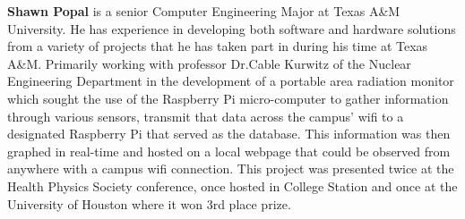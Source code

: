 \documentclass[letterpaper,12pt]{article}
\begin{document}
\textbf{Shawn Popal} is a senior Computer Engineering Major at Texas A\&M University. He has experience in developing both software and hardware solutions from a variety of projects that he has taken part in during his time at Texas A\&M. Primarily working with professor Dr.Cable Kurwitz of the Nuclear Engineering Department in the development of a portable area radiation monitor which sought the use of the Raspberry Pi micro-computer to gather information through various sensors, transmit that data across the campus' wifi to a designated Raspberry Pi that served as the database. This information was then graphed in real-time and hosted on a local webpage that could be observed from anywhere with a campus wifi connection. This project was presented twice at the Health Physics Society conference, once hosted in College Station and once at the University of Houston where it won 3rd place prize.  \par






\end{document}
